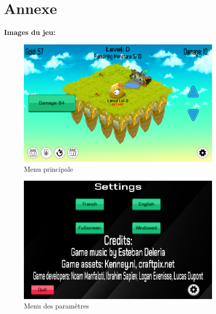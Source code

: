 \documentclass[11pt,a4paper]{article}
\begin{document}
\clearpage
\section{Annexe}
\glsaddall
\printglossary
\newpage

\textbf{Images du jeu: }\\

\begin{figure}[h] 
    \centering 
    \includegraphics[width=10cm]{img/jeuPrincipale.png} 
    \caption{Menu principale}
\end{figure}
\begin{figure}[h] 
    \centering 
    \includegraphics[width=10cm]{img/Parametre.png} 
    \caption{Menu des paramètres}
\end{figure}
\end{document}
